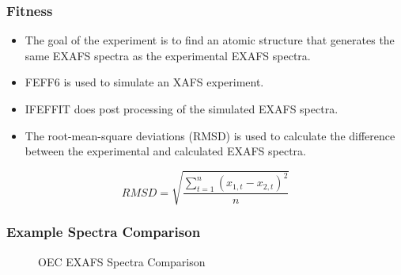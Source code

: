 \documentclass[10pt]{beamer}
\begin{document}
\begin{frame}
	\frametitle{Fitness}

	\begin{itemize}
		\item The goal of the experiment is to find an atomic structure that generates the same EXAFS spectra as the experimental EXAFS spectra.
		\item FEFF6 is used to simulate an XAFS experiment.
		\item IFEFFIT does post processing of the simulated EXAFS spectra.
		\item The root-mean-square deviations (RMSD) is used to calculate the difference between the experimental and calculated EXAFS spectra.
	\end{itemize}

	\begin{equation}
		RMSD = \sqrt{\frac{\sum_{t=1}^{n} \left ( x_{1,t}-x_{2,t} \right )^{2}}{n}}
	\end{equation}

\end{frame}

\begin{frame}
	\frametitle{Example Spectra Comparison}

	\begin{figure}
		\caption{OEC EXAFS Spectra Comparison}
	\end{figure}

\end{frame}
\end{document}
